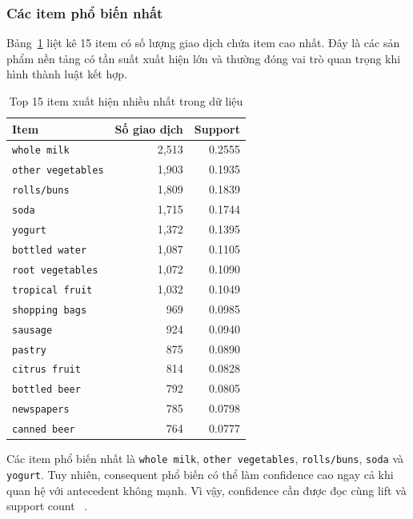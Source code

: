 \subsubsection{Các item phổ biến nhất}

Bảng~\ref{tab:application-top-items} liệt kê 15 item có số lượng giao dịch chứa item cao nhất. Đây là các sản phẩm nền tảng có tần suất xuất hiện lớn và thường đóng vai trò quan trọng khi hình thành luật kết hợp.

\begin{table}[H]
\centering
\caption{Top 15 item xuất hiện nhiều nhất trong dữ liệu}
\label{tab:application-top-items}
\begin{tabular}{lrr}
\toprule
Item & Số giao dịch & Support \\
\midrule
\texttt{whole milk} & 2,513 & 0.2555 \\
\texttt{other vegetables} & 1,903 & 0.1935 \\
\texttt{rolls/buns} & 1,809 & 0.1839 \\
\texttt{soda} & 1,715 & 0.1744 \\
\texttt{yogurt} & 1,372 & 0.1395 \\
\texttt{bottled water} & 1,087 & 0.1105 \\
\texttt{root vegetables} & 1,072 & 0.1090 \\
\texttt{tropical fruit} & 1,032 & 0.1049 \\
\texttt{shopping bags} & 969 & 0.0985 \\
\texttt{sausage} & 924 & 0.0940 \\
\texttt{pastry} & 875 & 0.0890 \\
\texttt{citrus fruit} & 814 & 0.0828 \\
\texttt{bottled beer} & 792 & 0.0805 \\
\texttt{newspapers} & 785 & 0.0798 \\
\texttt{canned beer} & 764 & 0.0777 \\
\bottomrule
\end{tabular}
\end{table}


Các item phổ biến nhất là \texttt{whole milk}, \texttt{other vegetables},
\texttt{rolls/buns}, \texttt{soda} và \texttt{yogurt}. Tuy nhiên, consequent
phổ biến có thể làm confidence cao ngay cả khi quan hệ với antecedent không
mạnh. Vì vậy, confidence cần được đọc cùng lift và support count
~\cite{hahsler2008interest}.

